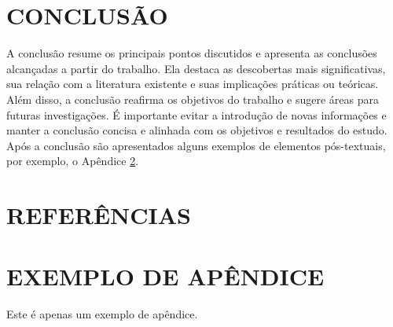 \documentclass[artigo,times,capa]{iftex2024}
\begin{document}
\section{CONCLUSÃO}

A conclusão resume os principais pontos discutidos e apresenta as conclusões alcançadas a partir do trabalho.
Ela destaca as descobertas mais significativas, sua relação com a literatura existente e suas implicações práticas ou teóricas.
Além disso, a conclusão reafirma os objetivos do trabalho e sugere áreas para futuras investigações.
É importante evitar a introdução de novas informações e manter a conclusão concisa e alinhada com os objetivos e resultados do estudo.
Após a conclusão são apresentados alguns exemplos de elementos pós-textuais, por exemplo, o Apêndice \ref{ap:exemplo}.

\section*{REFERÊNCIAS}

\printbibliography

\appendix

\section{EXEMPLO DE APÊNDICE} \label{ap:exemplo}

Este é apenas um exemplo de apêndice.

\attachment
\end{document}
